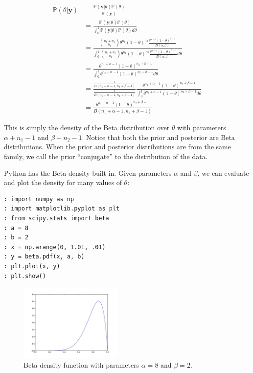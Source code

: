 \begin{align*}
\mathbb{P}(\theta | \mathbf{y}) & = \frac{\mathbb{P}(\mathbf{y} | \theta)\mathbb{P}(\theta)}{\mathbb{P}(\mathbf{y})} \\
& = \frac{\mathbb{P}(\mathbf{y} | \theta)\mathbb{P}(\theta)}{\int_{0}^{1} \mathbb{P}(\mathbf{y} | \theta)\mathbb{P}(\theta) d\theta} \\
& = \frac{{n_{1} + n_{2} \choose n_{1}} \theta^{n_{1}}(1-\theta)^{n_{2}} \frac{\theta^{\alpha - 1}(1 - \theta)^{\beta - 1}}{B(\alpha,\beta)}}{\int_{0}^{1} {n_{1} + n_{2} \choose n_{1}} \theta^{n_{1}}(1-\theta)^{n_{2}} \frac{\theta^{\alpha - 1}(1 - \theta)^{\beta - 1}}{B(\alpha,\beta)} d\theta} \\
& = \frac{ \theta^{n_{1} + \alpha - 1}(1-\theta)^{n_{2} + \beta - 1}}{\int_{0}^{1} \theta^{n_{1} + \alpha - 1}(1-\theta)^{n_{2} + \beta - 1} d\theta} \\
& = \frac{\frac{1}{B(n_{1} + \alpha - 1, n_{2} + \beta - 1)}}{\frac{1}{B(n_{1} + \alpha - 1, n_{2} + \beta - 1)}} \frac{ \theta^{n_{1} + \alpha - 1}(1-\theta)^{n_{2} + \beta - 1}}{\int_{0}^{1} \theta^{n_{1} + \alpha - 1}(1-\theta)^{n_{2} + \beta - 1} d\theta} \\
& = \frac{ \theta^{n_{1} + \alpha - 1}(1-\theta)^{n_{2} + \beta - 1}}{B(n_{1} + \alpha - 1, n_{2} + \beta - 1)}
\end{align*}

This is simply the density of the Beta distribution over $\theta$ with parameters $\alpha + n_{1} - 1$ and $\beta + n_{2} - 1$. Notice that both the prior and posterior are Beta distributions. When the prior and posterior distributions are from the same family, we call the prior ``conjugate'' to the distribution of the data. 

Python has the Beta density built in. Given parameters $\alpha$ and $\beta$, we can evaluate and plot the density for many values of $\theta$:

\begin{lstlisting}
: import numpy as np
: import matplotlib.pyplot as plt
: from scipy.stats import beta
: a = 8
: b = 2
: x = np.arange(0, 1.01, .01)
: y = beta.pdf(x, a, b)
: plt.plot(x, y)
: plt.show()
\end{lstlisting}

\begin{figure}[h]
\begin{center}
\includegraphics[height=1.5in]{beta.jpeg}
\end{center}
\caption{Beta density function with parameters $\alpha = 8$ and $\beta = 2$.}
\end{figure}

